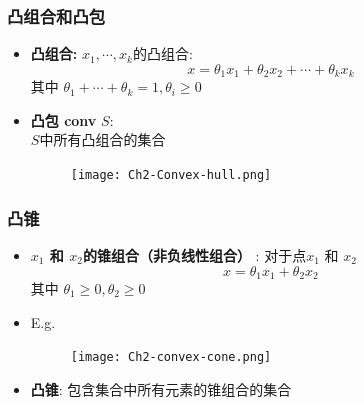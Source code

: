 \documentclass[handout]{beamer}
\begin{document}
\begin{frame}
\frametitle{凸组合和凸包}

\begin{itemize}
  \item \textbf{凸组合:}  $x_1,\cdots,x_k$的凸组合:  
\begin{equation}
x=\theta_{1} x_{1}+\theta_{2} x_{2}+\cdots+\theta_{k} x_{k}
\end{equation}
其中 $\theta_{1}+\cdots+\theta_{k}=1, \theta_{i} \geq 0$\\

\item
\textbf{凸包 conv} $S$:\\ $S$中所有凸组合的集合
\begin{figure}[htbp]
\centering
\texttt{[image: Ch2-Convex-hull.png]}
\end{figure}

\end{itemize}
\end{frame}
\begin{frame}
\frametitle{凸锥}

\begin{itemize}
  \item \textbf{$x_1$ 和 $x_2$的锥组合（非负线性组合）} : 对于点$x_1$ 和 $x_2$
\begin{equation}
x=\theta_{1} x_{1}+\theta_{2} x_{2}
\end{equation}
其中 $\theta_{1} \geq 0, \theta_{2} \geq 0$

\item E.g.
\begin{figure}[htbp]
\centering
\texttt{[image: Ch2-convex-cone.png]}
\end{figure}

\item
\textbf{凸锥}: 包含集合中所有元素的锥组合的集合
\end{itemize}

\end{frame}
\end{document}
